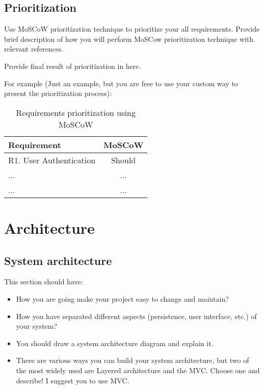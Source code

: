 \subsection{Prioritization} %
\label{sub:prioritization}

Use MoSCoW prioritization technique to prioritize your all requirements. Provide brief description of how you will perform MoSCow prioritization technique with relevant references.

Provide final result of prioritization in here.

For example (Just an example, but you are free to use your custom way to present the prioritization process):
\begin{table}[htb!]
  \centering
\begin{tabular}{l|c}
  \bf{Requirement} & \bf{MoSCoW}\\ \hline\hline
  R1. User Authentication & Should \\ \hline
  ... & ... \\ \hline
  ... & ... \\ \hline
\end{tabular}
  \caption{Requirements prioritization using MoSCoW}
  \label{tab:moscow}
\end{table}

\section{Architecture} %
\label{sec:architecture}

\subsection{System architecture} %
\label{sub:system_architecture}
This section should have:

\begin{itemize}
	\item How you are going make your project easy to change and maintain?
	\item How you have separated different aspects (persistence, user interface, etc.) of your system?
	\item You should draw a system architecture diagram and explain it. 
	\item There are various ways you can build your system architecture, but two of the most widely used are Layered architecture and the MVC. Choose one and describe! I suggest you to use MVC.
\end{itemize}


